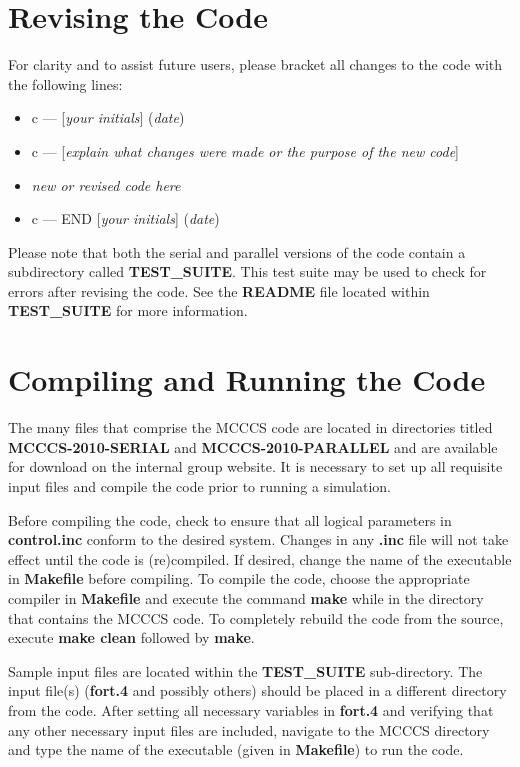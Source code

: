 \documentclass[12pt,letterpaper]{article}
\begin{document}
\newpage

\section{Revising the Code}
For clarity and to assist future users, please bracket all changes to the code with the following lines:
\begin{itemize}
\item c --- [\textit{your initials}] (\textit{date})
\item c --- [\textit{explain what changes were made or the purpose of the new code}]
\item {\textit{new or revised code here}}
\item c --- END [\textit{your initials}] (\textit{date})
\end{itemize}

\noindent Please note that both the serial and parallel versions of the code contain a subdirectory called {\bf TEST\_SUITE}.
This test suite may be used to check for errors after revising the code.  See the {\bf README} file located within {\bf TEST\_SUITE} 
for more information.

\section{Compiling and Running the Code}
\label{compile}
\noindent The many files that comprise the MCCCS code are located in directories titled 
{\bf MCCCS-2010-SERIAL} and {\bf MCCCS-2010-PARALLEL} and are available for download on the internal group website.
It is necessary to set up all requisite input files and compile the code prior to running a simulation.

\noindent Before compiling the code, check to ensure that all logical parameters in {\textbf{control.inc}} conform 
to the desired system.  Changes in any {\textbf{.inc}} file will not take effect until the code is (re)compiled.  
If desired, change the name of the executable in {\textbf{Makefile}} before compiling.
To compile the code, choose the appropriate compiler in {\textbf{Makefile}} and 
execute the command {\textbf{make}} while in the directory that contains the MCCCS code.  
To completely rebuild the code from the source, execute {\textbf{make clean}} followed by {\textbf{make}}.

\noindent Sample input files are located within the {\bf TEST\_SUITE} sub-directory.
The input file(s) ({\bf fort.4} and possibly others) should be placed in a different directory from the code. 
After setting all necessary variables in {\textbf{fort.4}} and verifying that any other necessary input files are
included, navigate to the MCCCS directory and type the name of the executable (given in {\bf Makefile}) to run the code.
\end{document}
